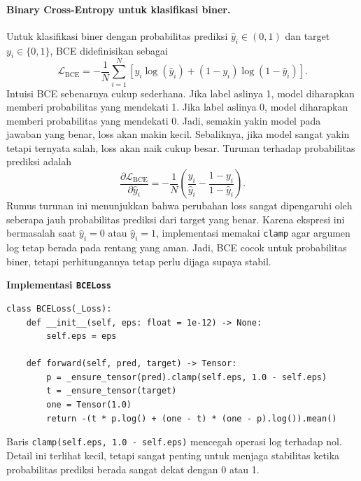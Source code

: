 \documentclass{article}
\begin{document}
\paragraph{Binary Cross-Entropy untuk klasifikasi biner.}
Untuk klasifikasi biner dengan probabilitas prediksi $\hat{y}_i\in(0,1)$ dan target $y_i\in\{0,1\}$, BCE didefinisikan sebagai
\begin{equation}
\mathcal{L}_{\mathrm{BCE}} = -\frac{1}{N}\sum_{i=1}^N \left[y_i\log(\hat{y}_i)+(1-y_i)\log(1-\hat{y}_i)\right].
\end{equation}
Intuisi BCE sebenarnya cukup sederhana. Jika label aslinya 1, model diharapkan memberi probabilitas yang mendekati 1. Jika label aslinya 0, model diharapkan memberi probabilitas yang mendekati 0. Jadi, semakin yakin model pada jawaban yang benar, loss akan makin kecil. Sebaliknya, jika model sangat yakin tetapi ternyata salah, loss akan naik cukup besar. Turunan terhadap probabilitas prediksi adalah
\begin{equation}
\frac{\partial \mathcal{L}_{\mathrm{BCE}}}{\partial \hat{y}_i}
=
-\frac{1}{N}\left(\frac{y_i}{\hat{y}_i}-\frac{1-y_i}{1-\hat{y}_i}\right).
\end{equation}
Rumus turunan ini menunjukkan bahwa perubahan loss sangat dipengaruhi oleh seberapa jauh probabilitas prediksi dari target yang benar. Karena ekspresi ini bermasalah saat $\hat{y}_i=0$ atau $\hat{y}_i=1$, implementasi memakai \texttt{clamp} agar argumen log tetap berada pada rentang yang aman. Jadi, BCE cocok untuk probabilitas biner, tetapi perhitungannya tetap perlu dijaga supaya stabil.

\noindent\textbf{Implementasi \texttt{BCELoss}}\par
\begin{lstlisting}
class BCELoss(_Loss):
    def __init__(self, eps: float = 1e-12) -> None:
        self.eps = eps

    def forward(self, pred, target) -> Tensor:
        p = _ensure_tensor(pred).clamp(self.eps, 1.0 - self.eps)
        t = _ensure_tensor(target)
        one = Tensor(1.0)
        return -(t * p.log() + (one - t) * (one - p).log()).mean()
\end{lstlisting}
Baris \texttt{clamp(self.eps, 1.0 - self.eps)} mencegah operasi log terhadap nol. Detail ini terlihat kecil, tetapi sangat penting untuk menjaga stabilitas ketika probabilitas prediksi berada sangat dekat dengan 0 atau 1.
\end{document}
